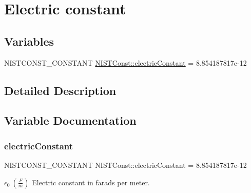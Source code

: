 \hypertarget{group___n_i_s_t_const-_electric_constant}{}\section{Electric constant}
\label{group___n_i_s_t_const-_electric_constant}
\subsection*{Variables}
\begin{DoxyCompactItemize}
\item 
N\+I\+S\+T\+C\+O\+N\+S\+T\+\_\+\+C\+O\+N\+S\+T\+A\+NT \mbox{\hyperlink{group___n_i_s_t_const-_electric_constant_ga8c31e3e43f4ddbc5e9d499a58a8b9de1}{N\+I\+S\+T\+Const\+::electric\+Constant}} = 8.\+854187817e-\/12
\end{DoxyCompactItemize}


\subsection{Detailed Description}


\subsection{Variable Documentation}
\mbox{\label{group___n_i_s_t_const-_electric_constant_ga8c31e3e43f4ddbc5e9d499a58a8b9de1}} 
\subsubsection{\texorpdfstring{electric\+Constant}{electricConstant}}
{\footnotesize\ttfamily N\+I\+S\+T\+C\+O\+N\+S\+T\+\_\+\+C\+O\+N\+S\+T\+A\+NT N\+I\+S\+T\+Const\+::electric\+Constant = 8.\+854187817e-\/12}

$\epsilon_0 \ (\frac{F}{m})$ Electric constant in farads per meter. 